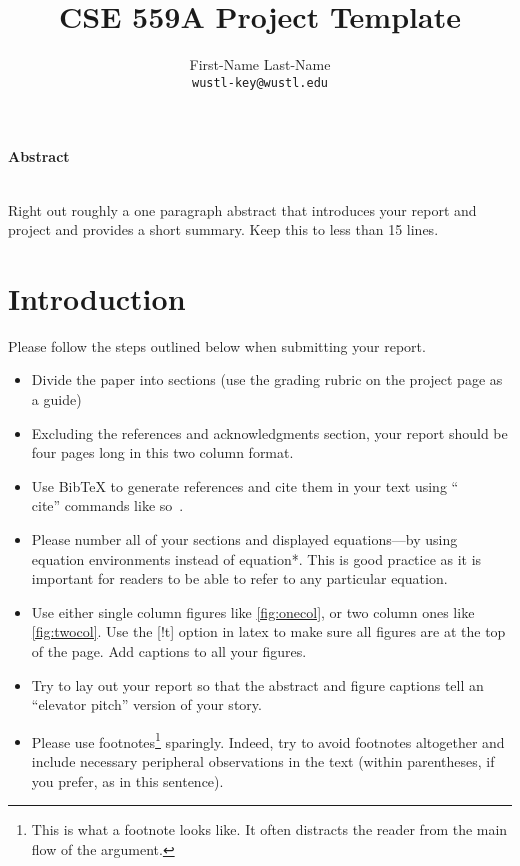 \documentclass[10pt,twocolumn,letterpaper]{article}
\date{}
\title{CSE 559A Project Template}
\author{%
First-Name Last-Name\\
{\tt wustl-key@wustl.edu}
}
\begin{document}
\maketitle

\begin{center}\textbf{Abstract}\\~\\\parbox{0.475\textwidth}{\em
    
    Right out roughly a one paragraph abstract that introduces your
    report and project and provides a short summary. Keep this to less
    than 15 lines.

}\end{center}

\section{Introduction}

Please follow the steps outlined below when submitting your report.

\begin{itemize}
\item Divide the paper into sections (use the grading rubric on the
  project page as a guide)
  
\item Excluding the references and acknowledgments section, your
  report should be four pages long in this two column format.

\item Use BibTeX to generate references and cite them in your text
  using ``\\cite'' commands like so~\cite{szeliski2010computer}.

\item Please number all of your sections and displayed equations---by
  using equation environments instead of equation*.  This is good
  practice as it is important for readers to be able to refer to any
  particular equation.

\item Use either single column figures like \ref{fig:onecol}, or two
  column ones like \ref{fig:twocol}. Use the [!t] option in latex to
  make sure all figures are at the top of the page. Add captions to
  all your figures.

\item Try to lay out your report so that the abstract and figure
  captions tell an ``elevator pitch'' version of your story.

\item Please use footnotes\footnote {This is what a footnote looks
    like.  It often distracts the reader from the main flow of the
    argument.} sparingly.  Indeed, try to avoid footnotes altogether
  and include necessary peripheral observations in the text (within
  parentheses, if you prefer, as in this sentence).
\end{itemize}
\end{document}
